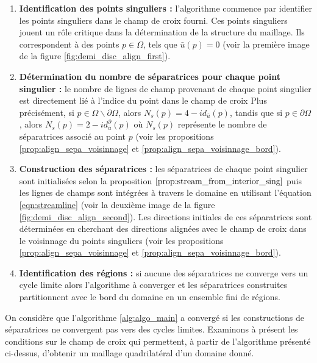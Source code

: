 \begin{enumerate}
\item \textbf{Identification des points singuliers :} l'algorithme commence par identifier les points singuliers dans le champ de croix fourni. Ces points singuliers jouent un rôle critique dans la détermination de la structure du maillage. Ils correspondent à des points $p\in\Omega$, tels que $\bar{u}(p)=0$ (voir la première image de la figure \ref{fig:demi_disc_align_first}).\\
\item \textbf{Détermination du nombre de séparatrices pour chaque point singulier :}
le nombre de lignes de champ provenant de chaque point singulier est directement lié à l'indice du point dans le champ de croix Plus précisément, si $p\in\Omega\backslash\partial\Omega$, alors $N_s(p) = 4 - id_{\bar{u}}(p)$, tandis que si $p\in\partial\Omega$, alors $N_s(p) = 2 - id_{\bar{u}}^\partial(p)$ où $N_s(p)$ représente le nombre de séparatrices associé au point $p$ (voir les propositions \ref{prop:align_sepa_voisinnage} et \ref{prop:align_sepa_voisinnage_bord}).\\
\item \textbf{Construction des séparatrices :} les séparatrices de chaque point singulier sont initialisées selon la proposition $\ref{prop:stream_from_interior_sing}$ puis les lignes de champs sont intégrées à travers le domaine en utilisant l'équation \eqref{eqn:streamline} (voir la deuxième image de la figure \ref{fig:demi_disc_align_second}). Les directions initiales de ces séparatrices sont déterminées en cherchant des directions alignées avec le champ de croix dans le voisinnage du points singuliers  (voir les propositions \ref{prop:align_sepa_voisinnage} et \ref{prop:align_sepa_voisinnage_bord}).\\
\item \textbf{Identification des régions :} si aucune des séparatrices ne converge vers un cycle limite alors l'algorithme à converger et les séparatrices construites partitionnent avec le bord du domaine en un ensemble fini de régions.\\
\end{enumerate}

On considère que l'algorithme
\ref{alg:algo_main} a convergé si les constructions de séparatrices ne convergent pas vers des cycles limites. Examinons à présent les conditions sur le champ de croix qui permettent, à partir de l'algorithme présenté ci-dessus, d'obtenir un maillage quadrilatéral d'un domaine donné.

